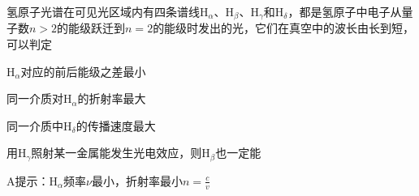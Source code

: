 氢原子光谱在可见光区域内有四条谱线\(\mathrm{H}_{\alpha}\)、\(\mathrm{H}_{\beta}\)、\(\mathrm{H}_{\gamma}\)和\(\mathrm{H}_{\delta}\)，都是氢原子中电子从量子数\(n > 2\)的能级跃迁到\(n = 2\)的能级时发出的光，它们在真空中的波长由长到短，可以判定\paren[]
\begin{choices}
    \item \(\mathrm{H}_{\alpha}\)对应的前后能级之差最小
    \item 同一介质对\(\mathrm{H}_{\alpha}\)的折射率最大
    \item 同一介质中\(\mathrm{H}_{\delta}\)的传播速度最大
    \item 用\(\mathrm{H}_{\gamma}\)照射某一金属能发生光电效应，则\(\mathrm{H}_{\beta}\)也一定能
\end{choices}
\begin{answer}
    A\qquad 提示：\(\mathrm{H}_{\alpha}\)频率\(\nu\)最小，折射率最小\(n = \frac{c}{v}\)
\end{answer}